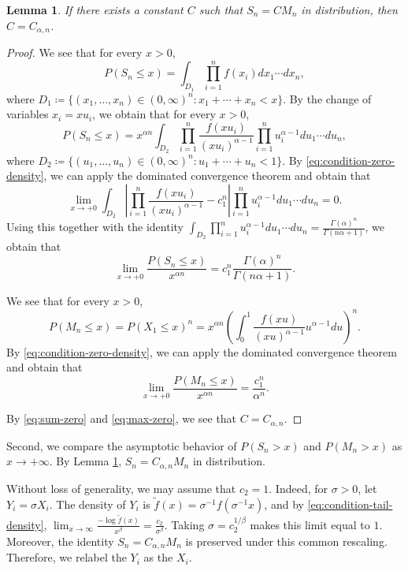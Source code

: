 \documentclass[a4paper, reqno, 11pt]{amsart}
\newtheorem{Lem}[Thm]{Lemma}
\theoremstyle{definition}
\begin{document}
\begin{Lem}\label{lem:const-unique-zero}
If there exists a constant $C$ such that $S_n = CM_n$ in distribution, 
then $C = C_{\alpha,n}$. 
\end{Lem}

\begin{proof}
We see that for every $x > 0$, 
\[ P(S_n \le x) = \int_{D_1} \prod_{i=1}^{n} f(x_i) dx_1 \cdots dx_{n},  \]
where $D_1 \coloneqq \{(x_1, \dots, x_n) \in (0,\infty)^n \colon x_1 + \cdots + x_n < x \}$. 
By the change of variables $x_i = x u_i$, 
we obtain that for every $x > 0$, 
\[ P(S_n \le x) = x^{\alpha n} \int_{D_2} \prod_{i=1}^{n} \frac{f(x u_i)}{(x u_i)^{\alpha -1}} \prod_{i=1}^{n} u_i^{\alpha -1} du_1 \cdots du_{n},  \]
where $D_2 \coloneqq \{(u_1, \dots, u_n) \in (0,\infty)^n \colon u_1 + \cdots + u_n < 1 \}$. 
By \eqref{eq:condition-zero-density}, 
we can apply the dominated convergence theorem and obtain that 
\[ \lim_{x \to +0} \int_{D_2} \left| \prod_{i=1}^{n} \frac{f(x u_i)}{(x u_i)^{\alpha -1}}  - c_1^n \right|  \prod_{i=1}^{n} u_i^{\alpha -1} du_1 \cdots du_{n} = 0. \]
Using this together with the identity $\int_{D_2}  \prod_{i=1}^{n} u_i^{\alpha -1} du_1 \cdots du_{n} = \frac{\Gamma(\alpha)^n}{\Gamma(n \alpha +1)}$, 
we obtain that 
\begin{equation}\label{eq:sum-zero}
\lim_{x \to +0} \frac{P(S_n \le x)}{x^{\alpha n}}  = c_1^n \frac{\Gamma(\alpha)^n}{\Gamma(n \alpha +1)}. 
\end{equation} 

We see that for every $x > 0$, 
\[ P(M_n \le x) = P(X_1 \le x)^n =  x^{\alpha n} \left(\int_0^1 \frac{f(xu)}{(xu)^{\alpha-1}} u^{\alpha-1} du \right)^n.  \]
By \eqref{eq:condition-zero-density}, 
we can apply the dominated convergence theorem and obtain that 
\begin{equation}\label{eq:max-zero} 
\lim_{x \to +0} \frac{P(M_n \le x)}{x^{\alpha n}}  = \frac{c_1^n}{\alpha^n}. 
\end{equation}

By \eqref{eq:sum-zero} and \eqref{eq:max-zero}, we see that $C = C_{\alpha,n}$. 
\end{proof}

Second, we compare the asymptotic behavior of $P(S_n > x)$ and $P(M_n > x)$ as $x \to +\infty$. 
By Lemma \ref{lem:const-unique-zero}, 
$S_n = C_{\alpha, n}  M_n$ in distribution. 

Without loss of generality, we may assume that $c_2=1$. 
Indeed, for $\sigma>0$, let $Y_i = \sigma X_i$. 
The density of $Y_i$ is $\widetilde f(x) = \sigma^{-1}f(\sigma^{-1}x)$, and by \eqref{eq:condition-tail-density}, 
 $\lim_{x\to\infty}\frac{-\log \widetilde f(x)}{x^\beta} = \frac{c_2}{\sigma^\beta}$.
Taking $\sigma=c_2^{1/\beta}$ makes this limit equal to $1$. 
Moreover, the identity $S_n = C_{\alpha,n}M_n$ is preserved under this common rescaling. 
Therefore, we relabel the $Y_i$ as the $X_i$.
\end{document}

